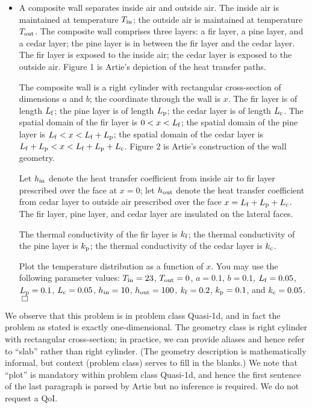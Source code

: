\documentclass[preprint,12pt]{article}
\begin{document}
\begin{itemize}
\item[]
A composite wall separates inside air and outside air. The inside air is maintained at temperature $T_{\rm in}$; the outside air is maintained at temperature $T_{\rm out}$. The composite wall comprises three layers: a fir layer, a pine layer, and a cedar layer; the pine layer is in between the fir layer and the cedar layer. The fir layer is exposed to the inside air; the cedar layer is exposed to the outside air. Figure 1 is Artie's depiction of the heat transfer paths.

The composite wall is a right cylinder with rectangular cross-section of dimensions $a$ and $b$; the coordinate through the wall is $x$. The fir layer is of length $L_{\rm f}$; the pine layer is of length $L_{\rm p}$; the cedar layer is of length $L_{\rm c}$. The spatial domain of the fir layer is $0 < x < L_{\rm f}$; the spatial domain of the pine layer is $L_{\rm f} < x < L_{\rm f} + L_{\rm p}$; the spatial domain of the cedar layer is $L_{\rm f} + L_{\rm p} < x < L_{\rm f} + L_{\rm p} + L_{\rm c}$. Figure 2 is Artie's construction of the wall geometry.

Let $h_{\rm in}$ denote the heat transfer coefficient from inside air to fir layer prescribed over the  face at $ x = 0 $; let $h_{\rm out}$ denote the heat transfer coefficient from cedar layer to outside air prescribed over the face $ x = L_{\rm f} + L_{\rm p} + L_{\rm c} $. The fir layer, pine layer, and cedar layer are insulated on the lateral faces.

The thermal conductivity of the fir layer is $k_{\rm f}$; the thermal conductivity of the pine layer is $k_{\rm p}$; the thermal conductivity of the cedar layer is $k_{\rm c}$.

Plot the temperature distribution as a function of $x$. You may use the following parameter values: $T_{\rm in} = 23$, $T_{\rm out} = 0$, $a = 0.1$, $b = 0.1$, $L_{\rm f} = 0.05$, $L_{\rm p} = 0.1$, $L_{\rm c} = 0.05$, $h_{\rm in} = 10$, $h_{\rm out} = 100$, $k_{\rm f} = 0.2$, $k_{\rm p}= 0.1$, and $k_{\rm c} = 0.05$. $\Box$
\end{itemize}
We observe that this problem is in problem class Quasi-1d, and in fact the problem as stated is exactly one-dimensional. The geometry class is right cylinder with rectangular cross-section; in practice, we can provide aliases and hence refer to  ``slab'' rather than right cylinder. (The geometry description is mathematically informal, but context (problem class) serves to fill in the blanks.) We note that ``plot'' is mandatory within problem class Quasi-1d, and hence the first sentence of the last paragraph is parsed by Artie but no inference is required. We do not request a QoI.
\end{document}
